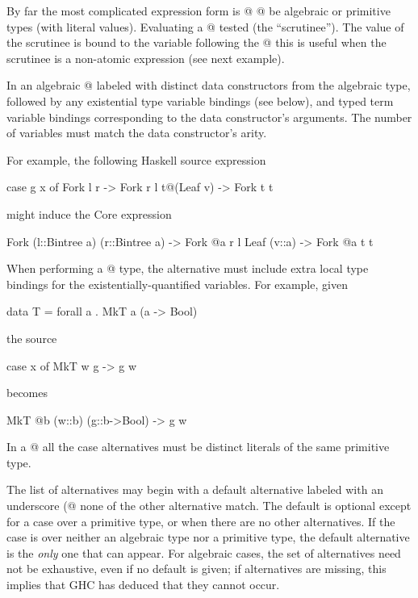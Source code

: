 \documentclass[10pt]{article}
\begin{document}
By far the most complicated expression form is @%
@%
be algebraic or primitive types (with literal values).
Evaluating a @%
tested (the ``scrutinee''). The value of the scrutinee is bound to the variable
following the @%
this is useful when the scrutinee is a non-atomic
expression (see next example).

In an algebraic @%
labeled with distinct data constructors from the algebraic type, followed by
any existential type variable bindings (see below), and 
typed term variable bindings corresponding to the data constructor's
arguments. The number of variables must match the data constructor's arity.

For example, the following Haskell source expression
\begin{code}
case g x of
  Fork l r -> Fork r l
  t@(Leaf v) -> Fork t t
\end{code}
might induce the Core expression
\begin{code}
   Fork (l::Bintree a) (r::Bintree a) ->
      Fork @a r l
   Leaf (v::a) ->
      Fork @a t t
\end{code}

When performing a @%
type, the alternative must include extra local type bindings 
for the existentially-quantified variables.  For example, given 
\begin{code}
data T = forall a . MkT a (a -> Bool)
\end{code}
the source
\begin{code}
case x of
  MkT w g -> g w
\end{code}
becomes
\begin{code}
  MkT @b (w::b) (g::b->Bool) -> g w
\end{code}

In a @%
all the case alternatives must be distinct literals of the same primitive type.

The list of alternatives may begin with a 
default alternative labeled with an underscore (@%
none of the other alternative match.  The default is optional except for a case
over a primitive type, or when there are no other alternatives.
If the case is over neither an
algebraic type nor a primitive type, the default alternative is the {\it only}
one that can appear.
For algebraic cases, the set of alternatives
need not be exhaustive, even if no default is given; if alternatives are missing,
this implies that GHC has deduced that they cannot occur. 
\end{document}
